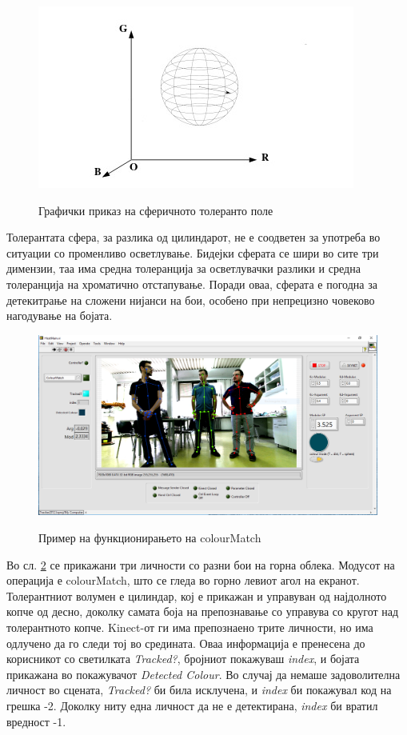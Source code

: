 \documentclass[11pt]{article}
\begin{document}
        \begin{figure}[H]
          \centering
          \includegraphics[width = 0.6\linewidth]{./images/sphere.png}
          \label{fig:sphere}
          \caption{Графички приказ на сферичното толеранто поле}
        \end{figure}
        Толерантата сфера, за разлика од цилиндарот, не е соодветен за употреба во ситуации со променливо осветлување. Бидејки сферата се шири во сите три димензии, таа има средна толеранција за осветлувачки разлики и средна толеранција на хроматично отстапување. Поради оваа, сферата е погодна за детекитрање на сложени нијанси на бои, особено при непрецизно човеково нагодување на бојата.

      \begin{figure}[h]
        \centering
        \caption{Пример на функционирањето на colourMatch}
        \includegraphics[width = 0.85\linewidth]{./images/colourMatchGroupExample.png}
        \label{fig:exampleColourMatch}
      \end{figure}

      Во сл. \ref{fig:exampleColourMatch} се прикажани три личности со разни бои на горна облека. Модусот на операција е colourMatch, што се гледа во горно левиот агол на екранот. Толерантниот волумен е цилиндар, кој е прикажан и управуван од најдолното копче од десно, доколку самата боја на препознавање со управува со кругот над толерантното копче. Kinect-от ги има препознаено трите личности, но има одлучено да го следи тој во средината. Оваа информација е пренесена до корисникот со светилката \textit{Tracked?}, бројниот покажуваш \textit{index}, и бојата прикажана во покажувачот \textit{Detected Colour}. Во случај да немаше задоволителна личност во сцената, \textit{Tracked?} би била исклучена, и \textit{index} би покажувал код на грешка -2. Доколку ниту една личност да не е детектирана, \textit{index} би вратил вредност -1.
\end{document}
